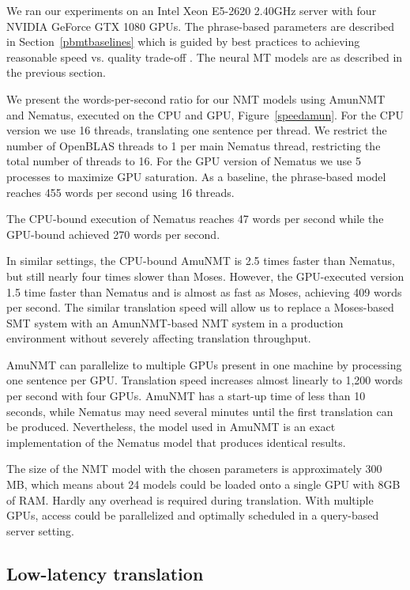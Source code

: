 \documentclass[11pt]{article}
\begin{document}
We ran our experiments on an Intel Xeon E5-2620 2.40GHz server with four NVIDIA GeForce GTX 1080 GPUs. The phrase-based parameters are described in Section~\ref{pbmtbaselines} which is guided by best practices to achieving reasonable speed vs. quality trade-off \cite{junczys_mtsummit_2013}. The neural MT models are as described in the previous section.

We present the words-per-second ratio for our NMT models using AmunNMT and Nematus, executed on the CPU and GPU, Figure~\ref{speedamun}. For the CPU version we use 16 threads, translating one sentence per thread. We restrict the number of OpenBLAS threads to 1 per main Nematus thread, restricting the total number of threads to 16. For the GPU version of Nematus we use 5 processes to maximize GPU saturation. As a baseline, the phrase-based model reaches 455 words per second using 16 threads.

The CPU-bound execution of Nematus reaches 47 words per second while the GPU-bound achieved 270 words per second. 

In similar settings, the CPU-bound AmuNMT is 2.5 times faster than Nematus, but still nearly four times slower than Moses. However, the GPU-executed version 1.5 time faster than Nematus and is almost as fast as Moses, achieving 409 words per second. The similar translation speed will allow us to replace a Moses-based SMT system with an AmunNMT-based NMT system in a production environment without severely affecting translation throughput. 

AmuNMT can parallelize to multiple GPUs present in one machine by processing one sentence per GPU. Translation speed increases almost linearly to 1,200 words per second with four GPUs. 
AmuNMT has a start-up time of less than 10 seconds, while Nematus may need several minutes until the first translation can be produced. Nevertheless, the model used in AmuNMT is an exact implementation of the Nematus model that produces identical results.

The size of the NMT model with the chosen parameters is approximately 300 MB, which means about 24 models could be loaded onto a single GPU with 8GB of RAM. Hardly any overhead is required during translation. With multiple GPUs, access could be parallelized and optimally scheduled in a query-based server setting. 

\subsection{Low-latency translation}
\end{document}
